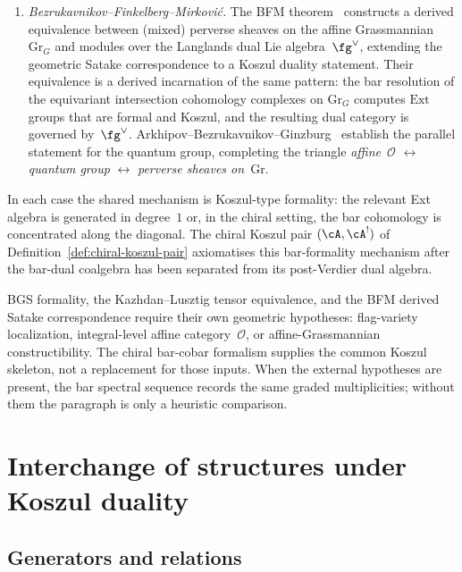 \begin{remark}
\begin{enumerate}[label=\textup{(\roman*)}]
\item \emph{Bezrukavnikov--Finkelberg--Mirkovi\'{c}.}
 The BFM theorem~\cite{BFM04} constructs a derived
 equivalence between (mixed) perverse sheaves on the affine
 Grassmannian $\mathrm{Gr}_G$ and modules over the Langlands
 dual Lie algebra~$\fg^\vee$, extending the geometric Satake
 correspondence to a Koszul duality statement. Their
 equivalence is a derived incarnation of the same pattern:
 the bar resolution of the equivariant intersection cohomology
 complexes on $\mathrm{Gr}_G$ computes $\mathrm{Ext}$ groups
 that are formal and Koszul, and the resulting dual category
 is governed by~$\fg^\vee$.
 Arkhipov--Bezrukavnikov--Ginzburg~\cite{ABG04} establish the
 parallel statement for the quantum group, completing the
 triangle \emph{affine~$\mathcal{O}$}
 $\leftrightarrow$ \emph{quantum group}
 $\leftrightarrow$ \emph{perverse sheaves on~$\mathrm{Gr}$}.
\end{enumerate}

In each case the shared mechanism is Koszul-type formality: the
relevant Ext algebra is generated in degree~$1$ or, in the chiral
setting, the bar cohomology is concentrated along the diagonal. The
chiral Koszul pair
$(\cA,\cA^!)$ of Definition~\ref{def:chiral-koszul-pair} axiomatises
this bar-formality mechanism after the bar-dual coalgebra has been
separated from its post-Verdier dual algebra.

BGS formality, the Kazhdan--Lusztig tensor equivalence, and the BFM
derived Satake correspondence require their own geometric hypotheses:
flag-variety localization, integral-level affine category~$\mathcal O$,
or affine-Grassmannian constructibility. The chiral bar-cobar
formalism supplies the common Koszul skeleton, not a replacement for
those inputs. When the external hypotheses are present, the bar
spectral sequence records the same graded multiplicities; without
them the paragraph is only a heuristic comparison.
\end{remark}



\section{Interchange of structures under Koszul duality}

\subsection{Generators and relations}

